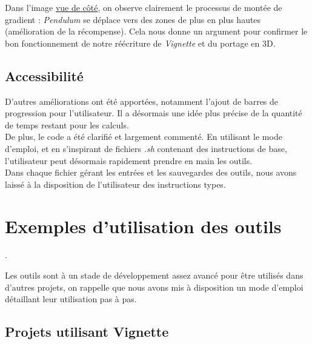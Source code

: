 \documentclass[12pt]{article}
\begin{document}
Dans l'image \hyperref[fig:vignetteCote]{vue de côté}, on observe clairement le processus de montée de gradient : \emph{Pendulum} se déplace vers des zones de plus en plus hautes (amélioration de la récompense). Cela nous donne un argument pour confirmer le bon fonctionnement de notre réécriture de \emph{Vignette} et du portage en 3D.\\


\newpage
\subsection{Accessibilité}

D’autres améliorations ont été apportées, notamment l’ajout de barres de progression pour l’utilisateur. Il a désormais une idée plus précise de la quantité de temps restant pour les calculs. \\

De plus, le code a été clarifié et largement commenté. En utilisant le mode d'emploi, et en s'inspirant de fichiers \emph{.sh} contenant des instructions de base, l'utilisateur peut désormais rapidement prendre en main les outils. \\

Dans chaque fichier gérant les entrées et les sauvegardes des outils, nous avons laissé à la disposition de l'utilisateur des instructions types. \\

\section{Exemples d'utilisation des outils} \label{Exemples}.

Les outils sont à un stade de développement assez avancé pour être utilisés dans d'autres projets, on rappelle que nous avons mis à disposition un mode d'emploi détaillant leur utilisation pas à pas. \\

\subsection{Projets utilisant Vignette}
\end{document}
